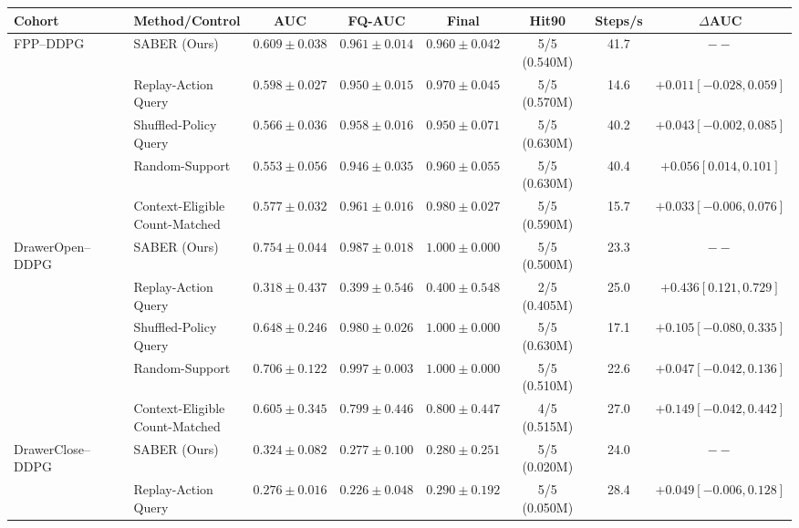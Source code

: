 \begin{table}[t]
\centering
\small
\setlength{\tabcolsep}{3pt}
\begin{tabular}{@{}llcccccc@{}}
\toprule
Cohort & Method/Control & AUC & FQ-AUC & Final & Hit90 & Steps/s & $\Delta$AUC \\
\midrule
FPP--DDPG & SABER (Ours) & $0.609 \pm 0.038$ & $0.961 \pm 0.014$ & $0.960 \pm 0.042$ & 5/5 (0.540M) & 41.7 & $--$ \\
 & \shortstack[l]{Replay-Action\\Query} & $0.598 \pm 0.027$ & $0.950 \pm 0.015$ & $0.970 \pm 0.045$ & 5/5 (0.570M) & 14.6 & $+0.011 [-0.028,0.059]$ \\
 & \shortstack[l]{Shuffled-Policy\\Query} & $0.566 \pm 0.036$ & $0.958 \pm 0.016$ & $0.950 \pm 0.071$ & 5/5 (0.630M) & 40.2 & $+0.043 [-0.002,0.085]$ \\
 & Random-Support & $0.553 \pm 0.056$ & $0.946 \pm 0.035$ & $0.960 \pm 0.055$ & 5/5 (0.630M) & 40.4 & $+0.056 [0.014,0.101]$ \\
 & \shortstack[l]{Context-Eligible\\Count-Matched} & $0.577 \pm 0.032$ & $0.961 \pm 0.016$ & $0.980 \pm 0.027$ & 5/5 (0.590M) & 15.7 & $+0.033 [-0.006,0.076]$ \\
\addlinespace[2pt]
DrawerOpen--DDPG & SABER (Ours) & $0.754 \pm 0.044$ & $0.987 \pm 0.018$ & $1.000 \pm 0.000$ & 5/5 (0.500M) & 23.3 & $--$ \\
 & \shortstack[l]{Replay-Action\\Query} & $0.318 \pm 0.437$ & $0.399 \pm 0.546$ & $0.400 \pm 0.548$ & 2/5 (0.405M) & 25.0 & $+0.436 [0.121,0.729]$ \\
 & \shortstack[l]{Shuffled-Policy\\Query} & $0.648 \pm 0.246$ & $0.980 \pm 0.026$ & $1.000 \pm 0.000$ & 5/5 (0.630M) & 17.1 & $+0.105 [-0.080,0.335]$ \\
 & Random-Support & $0.706 \pm 0.122$ & $0.997 \pm 0.003$ & $1.000 \pm 0.000$ & 5/5 (0.510M) & 22.6 & $+0.047 [-0.042,0.136]$ \\
 & \shortstack[l]{Context-Eligible\\Count-Matched} & $0.605 \pm 0.345$ & $0.799 \pm 0.446$ & $0.800 \pm 0.447$ & 4/5 (0.515M) & 27.0 & $+0.149 [-0.042,0.442]$ \\
\addlinespace[2pt]
DrawerClose--DDPG & SABER (Ours) & $0.324 \pm 0.082$ & $0.277 \pm 0.100$ & $0.280 \pm 0.251$ & 5/5 (0.020M) & 24.0 & $--$ \\
 & \shortstack[l]{Replay-Action\\Query} & $0.276 \pm 0.016$ & $0.226 \pm 0.048$ & $0.290 \pm 0.192$ & 5/5 (0.050M) & 28.4 & $+0.049 [-0.006,0.128]$ \\

\end{tabular}
\end{table}
